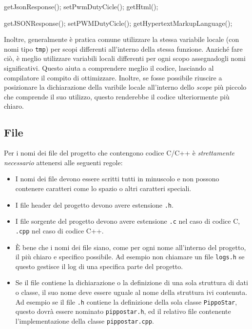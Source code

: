 \noindent\begin{minipage}[t]{\cbwidth}
\begin{RightCode}
getJsonResponse();
setPwmDutyCicle();
getHtml();
\end{RightCode}
\end{minipage}%
\hspace{\cbdistance}
\begin{minipage}[t]{\cbwidth}
\begin{ErrorCode}
getJSONResponse();
setPWMDutyCicle();
getHypertextMarkupLanguage();
\end{ErrorCode}
\end{minipage}

Inoltre, generalmente è pratica comune utilizzare la stessa variabile locale (con nomi tipo \texttt{tmp}) per scopi differenti all'interno della stessa funzione.
Anziché fare ciò, è meglio utilizzare variabili locali differenti per ogni scopo assegnadogli nomi significativi.
Questo aiuta a comprendere meglio il codice, lasciando al compilatore il compito di ottimizzare.
Inoltre, se fosse possibile riuscire a posizionare la dichiarazione della varibile locale all'interno dello \emph{scope} più piccolo che comprende il suo utilizzo, questo renderebbe il codice ulteriormente più chiaro.

\subsection{File}\label{ssec:filename}

Per i nomi dei file del progetto che contengono codice C/C++ è \emph{strettamente necessario} attenersi alle seguenti regole:
\begin{itemize}
	\item I nomi dei file devono essere scritti tutti in minuscolo e non possono contenere caratteri come lo spazio o altri caratteri speciali.
	\item I file header del progetto devono avere estensione \texttt{.h}.
	\item I file sorgente del progetto devono avere estensione \texttt{.c} nel caso di codice C, \texttt{.cpp} nel caso di codice C++.
	\item È bene che i nomi dei file siano, come per ogni nome all'interno del progetto, il più chiaro e specifico possibile.
		Ad esempio non chiamare un file \texttt{logs.h} se questo gestisce il log di una specifica parte del progetto.
	\item Se il file contiene la dichiarazione o la definizione di una sola struttura di dati o classe, il suo nome deve essere uguale al nome della struttura ivi contenuta.
		Ad esempio se il file \texttt{.h} contiene la definizione della sola classe \texttt{PippoStar}, questo dovrà essere nominato \texttt{pippostar.h}, ed il relativo file contenente l'implementazione della classe \texttt{pippostar.cpp}. 
\end{itemize}

